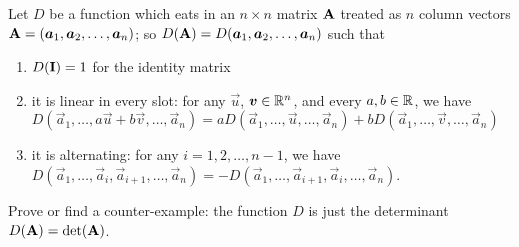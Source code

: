 \begin{exercise}
Let $D$ be a function which eats in an $n\times n$ matrix $\mathbf{A}$
treated as $n$ column vectors $\mathbf{A}=(\boldsymbol{a}_{1},\boldsymbol{a}_{2}, \dots,\boldsymbol{a}_{n})$;
so $D(\mathbf{A}) = D(\boldsymbol{a}_{1},\boldsymbol{a}_{2},\dots,\boldsymbol{a}_{n})$ such that
\begin{enumerate}
\item $D(\mathbf{I})=1$ for the identity matrix
\item it is linear in every slot: for any $\vec{u}$, $\boldsymbol{v}\in\mathbb{R}^{n}$,
  and every $a,b\in\mathbb{R}$, we have
  $D(\vec{a}_{1},\dots,a\vec{u}+b\vec{v},\dots,\vec{a}_{n})=aD(\vec{a}_{1},\dots,\vec{u},\dots,\vec{a}_{n}) + bD(\vec{a}_{1},\dots,\vec{v},\dots,\vec{a}_{n})$
\item it is alternating: for any $i=1,2,\dots,n-1$, we have
  $D(\vec{a}_{1},\dots,\vec{a}_{i},\vec{a}_{i+1},\dots,\vec{a}_{n})=-D(\vec{a}_{1},\dots,\vec{a}_{i+1},\vec{a}_{i},\dots,\vec{a}_{n})$.
\end{enumerate}
Prove or find a counter-example: the function $D$ is just the determinant $D(\mathbf{A})=\det(\mathbf{A})$.
\end{exercise}